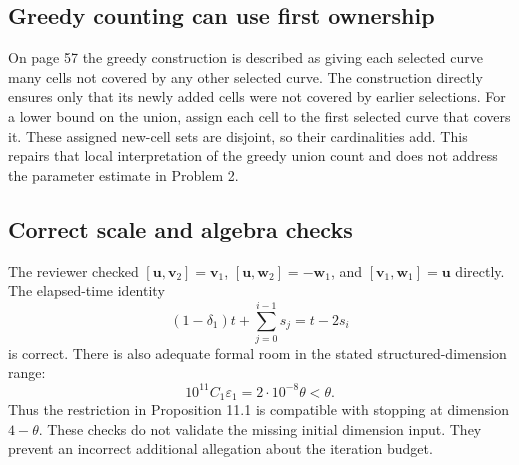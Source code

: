 \documentclass[10pt]{article}
\begin{document}
\subsection*{Greedy counting can use first ownership}
On page 57 the greedy construction is described as giving each selected curve many cells not covered by any other selected curve. The construction directly ensures only that its newly added cells were not covered by earlier selections. For a lower bound on the union, assign each cell to the first selected curve that covers it. These assigned new-cell sets are disjoint, so their cardinalities add. This repairs that local interpretation of the greedy union count and does not address the parameter estimate in Problem 2.\par
\subsection*{Correct scale and algebra checks}
The reviewer checked \([\mathbf u,\mathbf v_2]=\mathbf v_1\), \([\mathbf u,\mathbf w_2]=-\mathbf w_1\), and \([\mathbf v_1,\mathbf w_1]=\mathbf u\) directly. The elapsed-time identity \[(1-\delta_1)t+\sum_{j=0}^{i-1}s_j=t-2s_i\] is correct. There is also adequate formal room in the stated structured-dimension range: \[10^{11}C_1\varepsilon_1=2\cdot10^{-8}\theta<\theta.\] Thus the restriction in Proposition 11.1 is compatible with stopping at dimension \(4-\theta\). These checks do not validate the missing initial dimension input. They prevent an incorrect additional allegation about the iteration budget.\par
\end{document}
